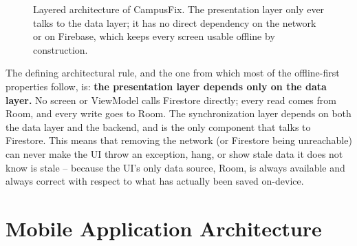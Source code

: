 \begin{figure}[htbp]
  \centering
  \caption{Layered architecture of CampusFix. The presentation layer only
  ever talks to the data layer; it has no direct dependency on the
  network or on Firebase, which keeps every screen usable offline by
  construction.}
  \label{fig:layered-architecture}
\end{figure}

The defining architectural rule, and the one from which most of the
offline-first properties follow, is: \textbf{the presentation layer depends
only on the data layer.} No screen or ViewModel calls Firestore directly;
every read comes from Room, and every write goes to Room. The
synchronization layer depends on both the data layer and the backend, and
is the only component that talks to Firestore. This means that removing
the network (or Firestore being unreachable) can never make the UI throw
an exception, hang, or show stale data it does not know is stale --
because the UI's only data source, Room, is always available and always
correct with respect to what has actually been saved on-device.

\section{Mobile Application Architecture}
\label{sec:mobile-architecture}

